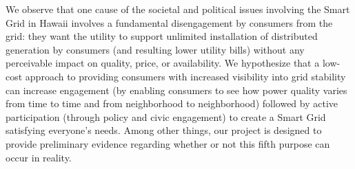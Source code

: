 We observe that one cause of the societal and political issues involving the Smart Grid in Hawaii involves a fundamental disengagement by consumers from the grid: they want the utility to support unlimited installation of distributed generation by consumers (and resulting lower utility bills) without any perceivable impact on quality, price, or availability.  We hypothesize that a low-cost approach to providing consumers with increased visibility into grid stability can increase engagement (by enabling consumers to see how power quality varies from time to time and from neighborhood to neighborhood) followed by active participation (through policy and civic engagement) to create a Smart Grid satisfying everyone's needs.  Among other things, our project is designed to provide preliminary evidence regarding whether or not this fifth purpose can occur in reality.

